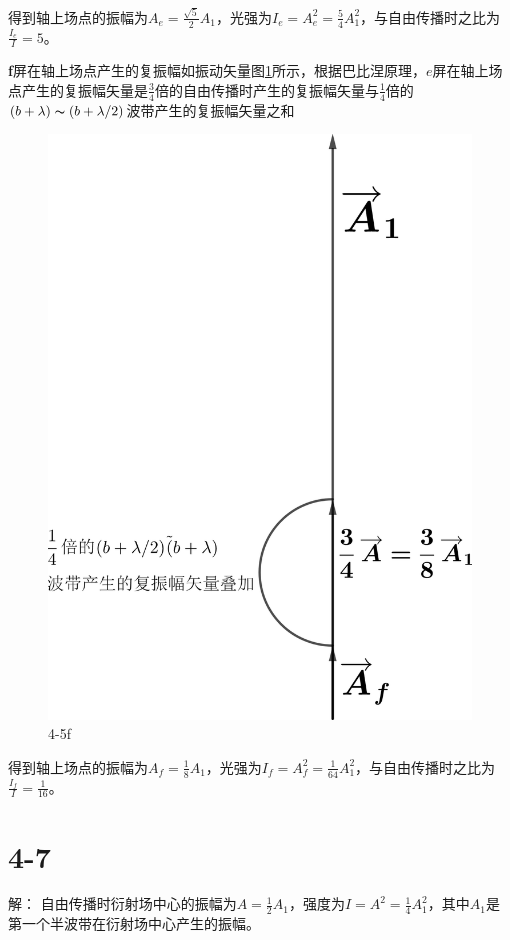 \documentclass[10pt,a4paper]{article}
\begin{document}
\noindent 得到轴上场点的振幅为$A_e=\frac{\sqrt{5}}{2}A_1$，光强为$I_e=A_e^2=\frac{5}{4}A_1^2$，与自由传播时之比为$\frac{I_e}{I}=5$。

\textbf{f}屏在轴上场点产生的复振幅如振动矢量图\ref{OpticsHomework_6_4-5f}所示，根据巴比涅原理，$e$屏在轴上场点产生的复振幅矢量是$\frac{3}{4}$倍的自由传播时产生的复振幅矢量与$\frac{1}{4}$倍的$(b+\lambda)\thicksim(b+\lambda/2)$波带产生的复振幅矢量之和
\begin{figure}[h]
\centering
\includegraphics[scale=.15]{OpticsHomework_6_4-5f(tailored).png}
\caption{4-5f}\label{OpticsHomework_6_4-5f}
\end{figure}

\noindent 得到轴上场点的振幅为$A_f=\frac{1}{8}A_1$，光强为$I_f=A_f^2=\frac{1}{64}A_1^2$，与自由传播时之比为$\frac{I_f}{I}=\frac{1}{16}$。
\section*{4-7}解：
自由传播时衍射场中心的振幅为$A=\frac{1}{2}A_1$，强度为$I=A^2=\frac{1}{4}A_1^2$，其中$A_1$是第一个半波带在衍射场中心产生的振幅。
\end{document}
